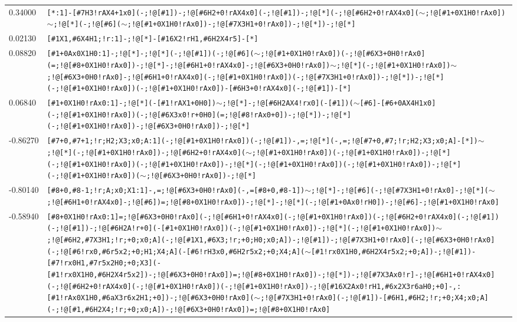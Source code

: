 \begin{longtable}{>{\baselineskip=10pt}p{} >{\baselineskip=10pt}p{}}
0.34000 & \texttt{[*:1]-[\#7H3!rAX4+1x0](-;!@[\#1])-;!@[\#6H2+0!rAX4x0](-;!@[\#1])-;!@[*](-;!@[\#6H2+0!rAX4x0]($\sim$;!@[\#1+0X1H0!rAx0])$\sim$;!@[*](-;!@[\#6]($\sim$;!@[\#1+0X1H0!rAx0])-;!@[\#7X3H1+0!rAx0])-;!@[*])-;!@[*]} \\ 
0.02130 & \texttt{[\#1X1,\#6X4H1;!r:1]-;!@[*]-[\#16X2!rH1,\#6H2X4r5]-[*]} \\ 
0.08820 & \texttt{[\#1+0Ax0X1H0:1]-;!@[*]-;!@[*](-;!@[\#1])(-;!@[\#6]($\sim$;!@[\#1+0X1H0!rAx0])(-;!@[\#6X3+0H0!rAx0](=;!@[\#8+0X1H0!rAx0])-;!@[*]-;!@[\#6H1+0!rAX4x0]-;!@[\#6X3+0H0!rAx0])$\sim$;!@[*](-;!@[\#1+0X1H0!rAx0])$\sim$;!@[\#6X3+0H0!rAx0]-;!@[\#6H1+0!rAX4x0](-;!@[\#1+0X1H0!rAx0])(-;!@[\#7X3H1+0!rAx0])-;!@[*])-;!@[*](-;!@[\#1+0X1H0!rAx0])(-;!@[\#1+0X1H0!rAx0])-[\#6H3+0!rAX4x0](-;!@[\#1])-[*]} \\ 
0.06840 & \texttt{[\#1+0X1H0!rAx0:1]-;!@[*](-[\#1!rAX1+0H0])$\sim$;!@[*]-;!@[\#6H2AX4!rx0](-[\#1])($\sim$[\#6]-[\#6+0AX4H1x0](-;!@[\#1+0X1H0!rAx0])(-;!@[\#6X3x0!r+0H0](=;!@[\#8!rAx0+0])-;!@[*])-;!@[*](-;!@[\#1+0X1H0!rAx0])-;!@[\#6X3+0H0!rAx0])-;!@[*]} \\ 
-0.86270 & \texttt{[\#7+0,\#7+1;!r;H2;X3;x0;A:1](-;!@[\#1+0X1H0!rAx0])(-;!@[\#1])-,=;!@[*](-,=;!@[\#7+0,\#7;!r;H2;X3;x0;A]-[*])$\sim$;!@[*](-;!@[\#1+0X1H0!rAx0])-;!@[\#6H2+0!rAX4x0]($\sim$;!@[\#1+0X1H0!rAx0])(-;!@[\#1+0X1H0!rAx0])-;!@[*](-;!@[\#1+0X1H0!rAx0])(-;!@[\#1+0X1H0!rAx0])-;!@[*](-;!@[\#1+0X1H0!rAx0])(-;!@[\#1+0X1H0!rAx0])-;!@[*](-;!@[\#1+0X1H0!rAx0])($\sim$;!@[\#6X3+0H0!rAx0])-;!@[*]} \\ 
-0.80140 & \texttt{[\#8+0,\#8-1;!r;A;x0;X1:1]-,=;!@[\#6X3+0H0!rAx0](-,=[\#8+0,\#8-1])$\sim$;!@[*]-;!@[\#6](-;!@[\#7X3H1+0!rAx0]-;!@[*]($\sim$;!@[\#6H1+0!rAX4x0]-;!@[\#6])=;!@[\#8+0X1H0!rAx0])-;!@[*]-;!@[*](-;!@[\#1+0Ax0!rH0])-;!@[\#6]-;!@[\#1+0X1H0!rAx0]} \\ 
-0.58940 & \texttt{[\#8+0X1H0!rAx0:1]=;!@[\#6X3+0H0!rAx0](-;!@[\#6H1+0!rAX4x0](-;!@[\#1+0X1H0!rAx0])(-;!@[\#6H2+0!rAX4x0](-;!@[\#1])(-;!@[\#1])-;!@[\#6H2A!r+0](-[\#1+0X1H0!rAx0])(-;!@[\#1+0X1H0!rAx0])-;!@[*](-;!@[\#1+0X1H0!rAx0])$\sim$;!@[\#6H2,\#7X3H1;!r;+0;x0;A](-;!@[\#1X1,\#6X3;!r;+0;H0;x0;A])-;!@[\#1])-;!@[\#7X3H1+0!rAx0](-;!@[\#6X3+0H0!rAx0](-;!@[\#6!rx0,\#6r5x2;+0;H1;X4;A](-[\#6!rH3x0,\#6H2r5x2;+0;X4;A]($\sim$[\#1!rx0X1H0,\#6H2X4r5x2;+0;A])-;!@[\#1])-[\#7!rx0H1,\#7r5x2H0;+0;X3](-[\#1!rx0X1H0,\#6H2X4r5x2])-;!@[\#6X3+0H0!rAx0])=;!@[\#8+0X1H0!rAx0])-;!@[*])-;!@[\#7X3Ax0!r]-;!@[\#6H1+0!rAX4x0](-;!@[\#6H2+0!rAX4x0](-;!@[\#1+0X1H0!rAx0])(-;!@[\#1+0X1H0!rAx0])-;!@[\#16X2Ax0!rH1,\#6x2X3r6aH0;+0]-,:[\#1!rAx0X1H0,\#6aX3r6x2H1;+0])-;!@[\#6X3+0H0!rAx0]($\sim$;!@[\#7X3H1+0!rAx0](-;!@[\#1])-[\#6H1,\#6H2;!r;+0;X4;x0;A](-;!@[\#1,\#6H2X4;!r;+0;x0;A])-;!@[\#6X3+0H0!rAx0])=;!@[\#8+0X1H0!rAx0]} \\ 

\end{longtable}
